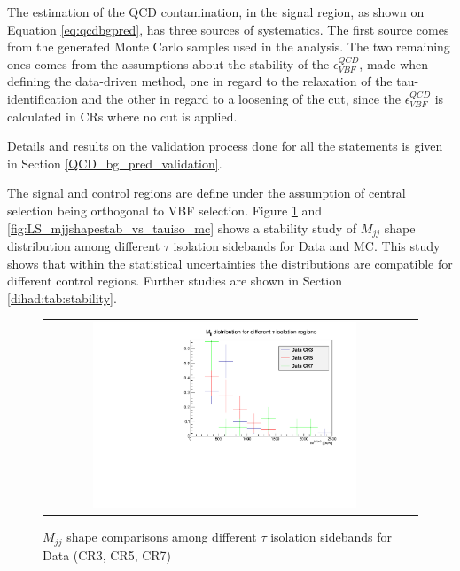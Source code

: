 The estimation of the QCD contamination, in the signal region, as shown on Equation \ref{eq:qcdbgpred}, has three sources of systematics. The first source comes from the generated Monte Carlo samples used in the analysis. The two remaining ones comes from the assumptions about the stability of the $\epsilon^{QCD}_{VBF}$, made when defining the data-driven method, one in regard to the relaxation of the tau-identification and the other in regard to a loosening of the \met cut, since the $\epsilon^{QCD}_{VBF}$ is calculated in CRs where no \met cut is applied.

Details and results on the validation process done for all the statements is given in Section \ref{QCD_bg_pred_validation}.

The signal and control regions are define under the assumption of central selection being orthogonal to VBF selection. Figure \ref{fig:LS_mjjshapestab_vs_tauiso_data} and \ref{fig:LS_mjjshapestab_vs_tauiso_mc} shows a stability study of $M_{jj}$ shape distribution among different $\tau$ isolation sidebands for Data and MC. This study shows that within the statistical uncertainties the distributions are compatible for different control regions. Further studies are shown in Section \ref{dihad:tab:stability}.

\begin{figure}[tbh!]
	\centering
	\begin{tabular}{cc}
		\includegraphics[width=0.75\textwidth]{PLOTS/diTauHadLSotherPlots/LS_mjjshapestab_vs_tauiso_data.pdf}
	\end{tabular}
	\caption{$M_{jj}$ shape comparisons among different $\tau$ isolation sidebands for Data (CR3, CR5, CR7)}
	\label{fig:LS_mjjshapestab_vs_tauiso_data}
\end{figure}

